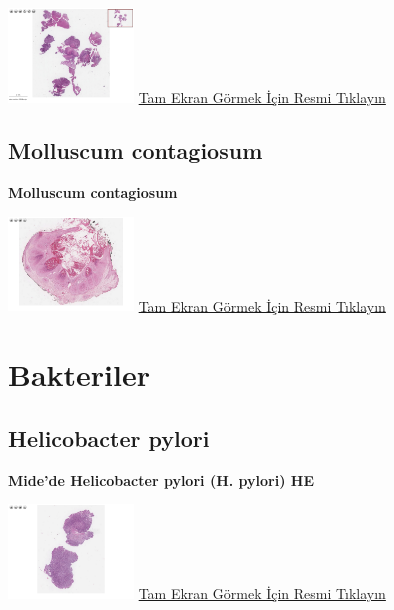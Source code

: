 \documentclass[
  letterpaper,
  DIV=11,
  numbers=noendperiod]{scrreprt}
\begin{document}
\href{https://images.patolojiatlasi.com/HSV/herpesesophagitis/viewer_z0.html}{\includegraphics[width=0.25\textwidth,height=\textheight]{./screenshots/herpesesophagitis_screenshot.png}}
\href{https://images.patolojiatlasi.com/HSV/herpesesophagitis/viewer_z0.html}{Tam
Ekran Görmek İçin Resmi Tıklayın}

\hypertarget{sec-molluscum-contagiosum}{%
\section{Molluscum contagiosum}\label{sec-molluscum-contagiosum}}

\textbf{Molluscum contagiosum}

\href{https://images.patolojiatlasi.com/molluscum-contagiosum/HE.html}{\includegraphics[width=0.25\textwidth,height=\textheight]{./screenshots/molluscum-contagiosum_screenshot.png}}
\href{https://images.patolojiatlasi.com/molluscum-contagiosum/HE.html}{Tam
Ekran Görmek İçin Resmi Tıklayın}

\hypertarget{sec-bakteriler}{%
\chapter{Bakteriler}\label{sec-bakteriler}}

\hypertarget{sec-helicobacter-pylori}{%
\section{Helicobacter pylori}\label{sec-helicobacter-pylori}}

\textbf{Mide'de Helicobacter pylori (H. pylori) HE}

\href{https://images.patolojiatlasi.com/helicobacterpylori/HE.html}{\includegraphics[width=0.25\textwidth,height=\textheight]{./screenshots/helicobacterpylori_screenshot.png}}
\href{https://images.patolojiatlasi.com/helicobacterpylori/HE.html}{Tam
Ekran Görmek İçin Resmi Tıklayın}
\end{document}
